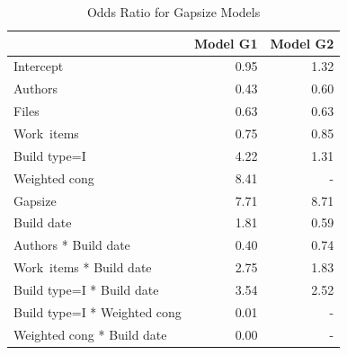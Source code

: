 \begin{table}[h]
\begin{center}
\begin{tabular}{l|rr}
  \hline
 & Model G1 & Model G2 \\ 
  \hline
Intercept & 0.95 & 1.32 \\ 
  Authors & 0.43 & 0.60 \\ 
  Files & 0.63 & 0.63 \\ 
  Work~items & 0.75 & 0.85 \\ 
  Build type=I & 4.22 & 1.31 \\ 
  Weighted cong & 8.41 & - \\ 
  Gapsize & 7.71 & 8.71 \\ 
  Build date & 1.81 & 0.59 \\ 
  Authors * Build date & 0.40 & 0.74 \\ 
  Work~items * Build date & 2.75 & 1.83 \\ 
  Build type=I * Build date & 3.54 & 2.52 \\ 
  Build type=I * Weighted cong & 0.01 & - \\ 
  Weighted cong * Build date & 0.00 & - \\ 
   \hline
\end{tabular}
\caption{Odds Ratio for Gapsize Models}
\label{tab:oddsratio_gapsize}
\end{center}
\end{table}


